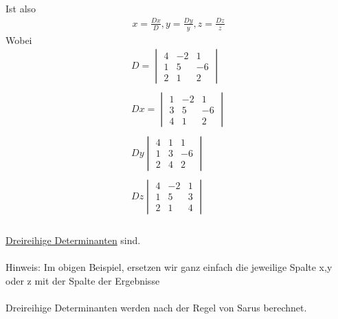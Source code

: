 Ist also
\begin{eqnarray*}
	x = \frac{Dx}{D}, y = \frac{Dy}{y}, z = \frac{Dz}{z}
\end{eqnarray*}
Wobei 
\begin{eqnarray*}
	D =
	\begin{vmatrix}
	4 &-2&1\\
	1 &5 &-6\\
	2 &1& 2
	\end{vmatrix}\\
	\\
	Dx = 
	\begin{vmatrix}
	1 &-2&1\\
	3 &5 &-6\\
	4 &1& 2
	\end{vmatrix}\\
	\\
	Dy
	\begin{vmatrix}
	4 &1&1\\
	1 &3 &-6\\
	2 &4& 2
	\end{vmatrix}\\
	\\
	Dz
	\begin{vmatrix}
	4 &-2&1\\
	1 &5 &3\\
	2 &1& 4
	\end{vmatrix}\\
\end{eqnarray*}
\\
\underline{Dreireihige Determinanten} sind. \\
\\
Hinweis: Im obigen Beispiel, ersetzen wir ganz einfach die jeweilige Spalte x,y oder z mit der Spalte der Ergebnisse
\\
\\
Dreireihige Determinanten werden nach der Regel von Sarus berechnet.\\
